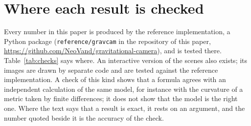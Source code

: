 \section{Where each result is checked}\label{app:checks}

Every number in this paper is produced by the reference implementation, a
Python package (\texttt{reference/gravcam} in the repository of this paper,
\url{https://github.com/NeoVand/gravitational-camera}), and is tested there.
Table~\ref{tab:checks} says where. An interactive version of the scenes also
exists; its images are drawn by separate code and are tested against the
reference implementation.
A check of this kind shows that a formula agrees with an independent
calculation of the same model, for instance with the curvature of a metric
taken by finite differences; it does not show that the model is the right one.
Where the text says that a result is exact, it rests on an argument, and the
number quoted beside it is the accuracy of the check.

